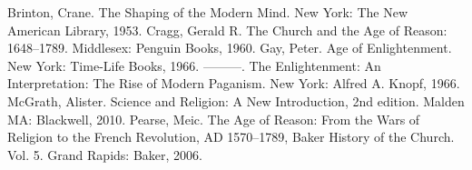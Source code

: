 \begin{readinglist}
\entry Brinton, Crane. The Shaping of the Modern Mind. New York: The New American Library, 1953.
\entry Cragg, Gerald R. The Church and the Age of Reason: 1648–1789. Middlesex: Penguin Books, 1960.
\entry Gay, Peter. Age of Enlightenment. New York: Time-Life Books, 1966.
\entry ———. The Enlightenment: An Interpretation: The Rise of Modern Paganism. New York: Alfred A.
  Knopf, 1966.
\entry McGrath, Alister. Science and Religion: A New Introduction, 2nd edition. Malden MA:
  Blackwell, 2010.
\entry Pearse, Meic. The Age of Reason: From the Wars of Religion to the French Revolution, AD
  1570–1789, Baker History of the Church. Vol. 5. Grand Rapids: Baker, 2006.
\end{readinglist}

